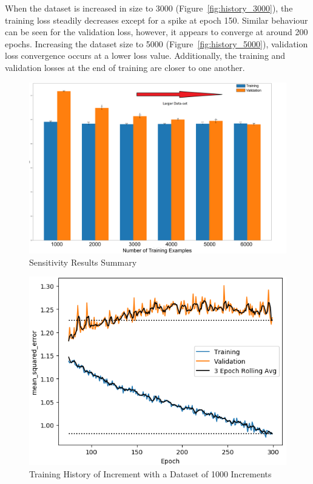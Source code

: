\noindent When the dataset is increased in size to 3000 (Figure~\ref{fig:history_3000}), the training loss steadily decreases except for a spike at epoch 150. Similar behaviour can be seen for the validation loss, however, it appears to converge at around 200 epochs. Increasing the dataset size to 5000 (Figure~\ref{fig:history_5000}), validation loss convergence occurs at a lower loss value. Additionally, the training and validation losses at the end of training are closer to one another.
\\

\begin{figure}[b]
	\centering
	\includegraphics[scale=0.14]{Figures/comparing_models_Sensitivity.png}
	\caption{Sensitivity Results Summary}
	\label{fig:sensitivity_summary}
\end{figure}

\begin{figure}[b]
	\centering
	\includegraphics[scale=0.75]{Figures/TrainHistory_dataset_cases1000_C0_321_L0_13_0_321_0_13_48_1_allI0.png}
	\caption{Training History of Increment with a Dataset of 1000 Increments}
	\label{fig:history_1000}
\end{figure}

